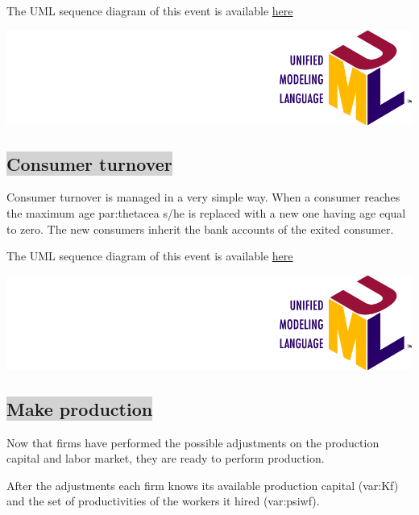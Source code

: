 \documentclass{book}
\newcommand{\doclocation}{file:///Users/giulioni/Documents/workspace/gabriele/docs}
\begin{document}
\vskip3mm
The UML sequence diagram of this event is available \href{\doclocation/umldoc/allocateInvestments.html}{here}
\begin{marginfigure}
	\includegraphics[scale=0.1]{uml.png}
\end{marginfigure}





\subsection*{\colorbox{lightgray}{Consumer turnover}}

Consumer turnover is managed in a very simple way. When a consumer reaches the maximum age \gls{par:thetacea} s/he is replaced with a new one having age equal to zero. The new consumers inherit the bank accounts of the exited consumer.

\vskip3mm
The UML sequence diagram of this event is available \href{\doclocation/umldoc/performConsumersTurnover.html}{here}
\begin{marginfigure}
	\includegraphics[scale=0.1]{uml.png}
\end{marginfigure}
\vskip3mm




\subsection*{\colorbox{lightgray}{Make production}}

Now that firms have performed the possible adjustments on the production capital and labor market, they are ready to perform production.  

After the adjustments each firm knows its available production capital (\gls{var:Kf}) and the set of productivities of the workers it hired (\gls{var:psiwf}).  
\end{document}
